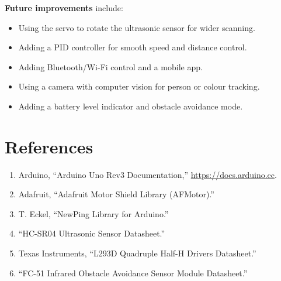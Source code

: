 \documentclass[12pt,a4paper]{article}
\begin{document}
\textbf{Future improvements} include:
\begin{itemize}
  \item Using the servo to rotate the ultrasonic sensor for wider scanning.
  \item Adding a PID controller for smooth speed and distance control.
  \item Adding Bluetooth/Wi-Fi control and a mobile app.
  \item Using a camera with computer vision for person or colour tracking.
  \item Adding a battery level indicator and obstacle avoidance mode.
\end{itemize}

\section*{References}
\begin{enumerate}
  \item Arduino, ``Arduino Uno Rev3 Documentation,'' \url{https://docs.arduino.cc}.
  \item Adafruit, ``Adafruit Motor Shield Library (AFMotor).''
  \item T. Eckel, ``NewPing Library for Arduino.''
  \item ``HC-SR04 Ultrasonic Sensor Datasheet.''
  \item Texas Instruments, ``L293D Quadruple Half-H Drivers Datasheet.''
  \item ``FC-51 Infrared Obstacle Avoidance Sensor Module Datasheet.''
\end{enumerate}

\newpage
\appendix
\end{document}
